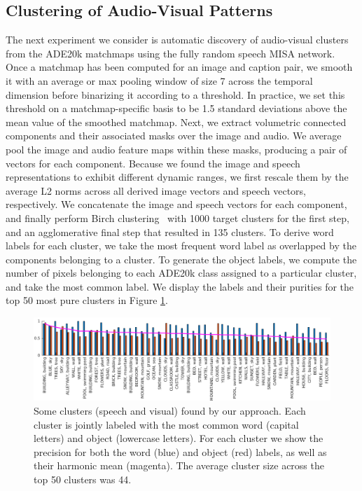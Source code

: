 \subsection{Clustering of Audio-Visual Patterns}
The next experiment we consider is automatic discovery of audio-visual clusters from the ADE20k matchmaps using the fully random speech MISA network. Once a matchmap has been computed for an image and caption pair, we smooth it with an average or max pooling window of size 7 across the temporal dimension before binarizing it according to a threshold. In practice, we set this threshold on a matchmap-specific basis to be 1.5 standard deviations above the mean value of the smoothed matchmap. Next, we extract volumetric connected components and their associated masks over the image and audio. We average pool the image and audio feature maps within these masks, producing a pair of vectors for each component. Because we found the image and speech representations to exhibit different dynamic ranges, we first rescale them by the average L2 norms across all derived image vectors and speech vectors, respectively. We concatenate the image and speech vectors for each component, and finally perform Birch clustering~\cite{birch} with 1000 target clusters for the first step, and an agglomerative final step that resulted in 135 clusters. To derive word labels for each cluster, we take the most frequent word label as overlapped by the components belonging to a cluster. To generate the object labels, we compute the number of pixels belonging to each ADE20k class assigned to a particular cluster, and take the most common label. We display the labels and their purities for the top 50 most pure clusters in Figure \ref{fig:clusters}.
\begin{figure}
    \includegraphics[width=1\linewidth]{figures/images_paper/cluster_purities_cropped.png}
    \caption[Some clusters (speech and visual) found by our approach]{Some clusters (speech and visual) found by our approach. Each cluster is jointly labeled with the most common word (capital letters) and object (lowercase letters). For each cluster we show the precision for both the word (blue) and object (red) labels, as well as their harmonic mean (magenta). The average cluster size across the top 50 clusters was 44.}
    \label{fig:clusters}
\end{figure}

